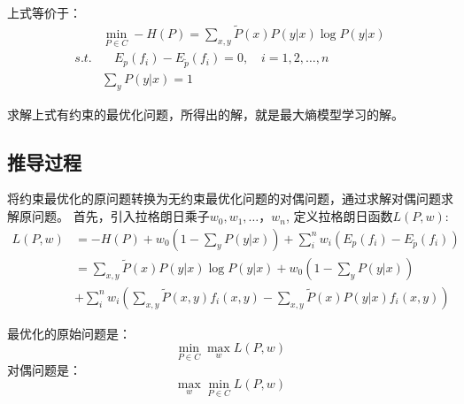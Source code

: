 \documentclass[a4paper,12pt]{book}
\begin{document}
    上式等价于：
    \begin{equation}
        \begin{split}
            &\min_{P \in C} -H(P)=\sum_{x,y} \widetilde{P}(x)P(y|x) \log P(y|x)\\
            s.t. &\quad E_p(f_i)-E_{\widetilde{p}}(f_i)=0, \quad  i=1, 2, \dots, n\\
            &\sum_yP(y|x)=1
        \end{split}
    \end{equation}


    求解上式有约束的最优化问题，所得出的解，就是最大熵模型学习的解。

    \subsection{推导过程}
    将约束最优化的原问题转换为无约束最优化问题的对偶问题，通过求解对偶问题求解原问题。
    首先，引入拉格朗日乘子$w_0, w_1, \dots， w_n$, 定义拉格朗日函数$L(P,w)$:
    \begin{equation}
        \begin{split}
            L(P,w) &= -H(P) + w_0(1-\sum_yP(y|x)) + \sum_i^n w_i(E_p(f_i)-E_{\widetilde{p}}(f_i)) \\
            &=\sum_{x,y} \widetilde{P}(x)P(y|x) \log P(y|x) + w_0(1-\sum_yP(y|x)) \\
            &+ \sum_i^n w_i(\sum_{x, y} \widetilde{P}(x,y)f_i(x,y)-\sum_{x, y} \widetilde{P}(x)P(y|x)f_i(x,y))
        \end{split}
    \end{equation}

    最优化的原始问题是：
    \begin{equation}
        \min_{P \in C} \max_w L(P,w)
    \end{equation}
    对偶问题是：
    \begin{equation}
        \max_w \min_{P \in C} L(P,w)
    \end{equation}
\end{document}
